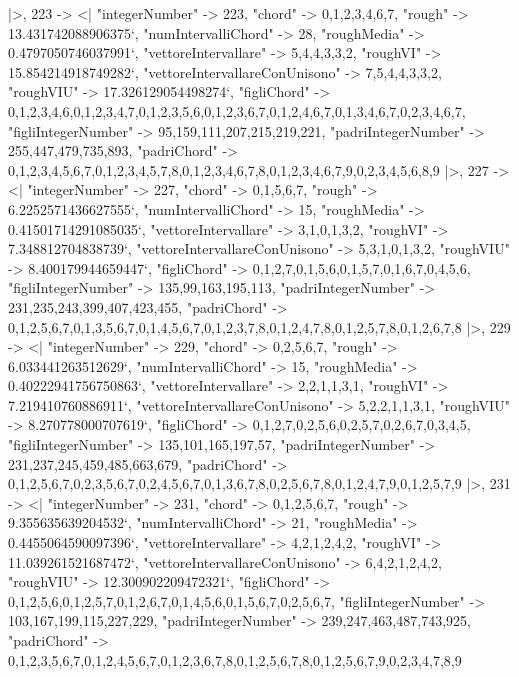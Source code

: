 \documentclass[
]{article}
\begin{document}
\begin{DatasetVerbatim}
  |>,
  223 -> <|
    "integerNumber" -> 223,
    "chord" -> {0,1,2,3,4,6,7},
    "rough" -> 13.431742088906375`,
    "numIntervalliChord" -> 28,
    "roughMedia" -> 0.4797050746037991`,
    "vettoreIntervallare" -> {5,4,4,3,3,2},
    "roughVI" -> 15.854214918749282`,
    "vettoreIntervallareConUnisono" -> {7,5,4,4,3,3,2},
    "roughVIU" -> 17.326129054498274`,
    "figliChord" -> {{0,1,2,3,4,6},{0,1,2,3,4,7},{0,1,2,3,5,6},{0,1,2,3,6,7},{0,1,2,4,6,7},{0,1,3,4,6,7},{0,2,3,4,6,7}},
    "figliIntegerNumber" -> {95,159,111,207,215,219,221},
    "padriIntegerNumber" -> {255,447,479,735,893},
    "padriChord" -> {{0,1,2,3,4,5,6,7},{0,1,2,3,4,5,7,8},{0,1,2,3,4,6,7,8},{0,1,2,3,4,6,7,9},{0,2,3,4,5,6,8,9}}
  |>,
  227 -> <|
    "integerNumber" -> 227,
    "chord" -> {0,1,5,6,7},
    "rough" -> 6.2252571436627555`,
    "numIntervalliChord" -> 15,
    "roughMedia" -> 0.41501714291085035`,
    "vettoreIntervallare" -> {3,1,0,1,3,2},
    "roughVI" -> 7.348812704838739`,
    "vettoreIntervallareConUnisono" -> {5,3,1,0,1,3,2},
    "roughVIU" -> 8.400179944659447`,
    "figliChord" -> {{0,1,2,7},{0,1,5,6},{0,1,5,7},{0,1,6,7},{0,4,5,6}},
    "figliIntegerNumber" -> {135,99,163,195,113},
    "padriIntegerNumber" -> {231,235,243,399,407,423,455},
    "padriChord" -> {{0,1,2,5,6,7},{0,1,3,5,6,7},{0,1,4,5,6,7},{0,1,2,3,7,8},{0,1,2,4,7,8},{0,1,2,5,7,8},{0,1,2,6,7,8}}
  |>,
  229 -> <|
    "integerNumber" -> 229,
    "chord" -> {0,2,5,6,7},
    "rough" -> 6.033441263512629`,
    "numIntervalliChord" -> 15,
    "roughMedia" -> 0.40222941756750863`,
    "vettoreIntervallare" -> {2,2,1,1,3,1},
    "roughVI" -> 7.219410760886911`,
    "vettoreIntervallareConUnisono" -> {5,2,2,1,1,3,1},
    "roughVIU" -> 8.270778000707619`,
    "figliChord" -> {{0,1,2,7},{0,2,5,6},{0,2,5,7},{0,2,6,7},{0,3,4,5}},
    "figliIntegerNumber" -> {135,101,165,197,57},
    "padriIntegerNumber" -> {231,237,245,459,485,663,679},
    "padriChord" -> {{0,1,2,5,6,7},{0,2,3,5,6,7},{0,2,4,5,6,7},{0,1,3,6,7,8},{0,2,5,6,7,8},{0,1,2,4,7,9},{0,1,2,5,7,9}}
  |>,
  231 -> <|
    "integerNumber" -> 231,
    "chord" -> {0,1,2,5,6,7},
    "rough" -> 9.355635639204532`,
    "numIntervalliChord" -> 21,
    "roughMedia" -> 0.4455064590097396`,
    "vettoreIntervallare" -> {4,2,1,2,4,2},
    "roughVI" -> 11.039261521687472`,
    "vettoreIntervallareConUnisono" -> {6,4,2,1,2,4,2},
    "roughVIU" -> 12.300902209472321`,
    "figliChord" -> {{0,1,2,5,6},{0,1,2,5,7},{0,1,2,6,7},{0,1,4,5,6},{0,1,5,6,7},{0,2,5,6,7}},
    "figliIntegerNumber" -> {103,167,199,115,227,229},
    "padriIntegerNumber" -> {239,247,463,487,743,925},
    "padriChord" -> {{0,1,2,3,5,6,7},{0,1,2,4,5,6,7},{0,1,2,3,6,7,8},{0,1,2,5,6,7,8},{0,1,2,5,6,7,9},{0,2,3,4,7,8,9}}

\end{DatasetVerbatim}
\end{document}
